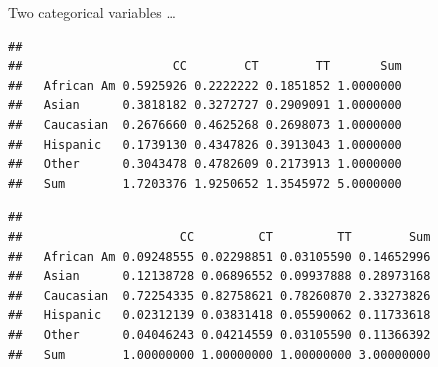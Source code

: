 \documentclass[
  ignorenonframetext,
]{beamer}
\newenvironment{Shaded}{\begin{snugshade}}{\end{snugshade}}
\newcommand{\CommentTok}[1]{\textcolor[rgb]{0.56,0.35,0.01}{\textit{#1}}}
\newcommand{\DecValTok}[1]{\textcolor[rgb]{0.00,0.00,0.81}{#1}}
\newcommand{\KeywordTok}[1]{\textcolor[rgb]{0.13,0.29,0.53}{\textbf{#1}}}
\newcommand{\NormalTok}[1]{#1}
\newcommand{\OperatorTok}[1]{\textcolor[rgb]{0.81,0.36,0.00}{\textbf{#1}}}
\begin{document}
\begin{frame}[fragile]{Two categorical variables \dots}
\protect\hypertarget{two-categorical-variables-1}{}

\scriptsize

\scriptsize

\begin{Shaded}
\end{Shaded}

\begin{verbatim}
##             
##                     CC        CT        TT       Sum
##   African Am 0.5925926 0.2222222 0.1851852 1.0000000
##   Asian      0.3818182 0.3272727 0.2909091 1.0000000
##   Caucasian  0.2676660 0.4625268 0.2698073 1.0000000
##   Hispanic   0.1739130 0.4347826 0.3913043 1.0000000
##   Other      0.3043478 0.4782609 0.2173913 1.0000000
##   Sum        1.7203376 1.9250652 1.3545972 5.0000000
\end{verbatim}

\begin{Shaded}
\end{Shaded}

\begin{verbatim}
##             
##                      CC         CT         TT        Sum
##   African Am 0.09248555 0.02298851 0.03105590 0.14652996
##   Asian      0.12138728 0.06896552 0.09937888 0.28973168
##   Caucasian  0.72254335 0.82758621 0.78260870 2.33273826
##   Hispanic   0.02312139 0.03831418 0.05590062 0.11733618
##   Other      0.04046243 0.04214559 0.03105590 0.11366392
##   Sum        1.00000000 1.00000000 1.00000000 3.00000000
\end{verbatim}

\normalsize

\end{frame}
\end{document}
